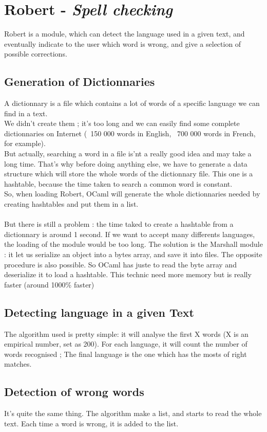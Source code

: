 \chapter{Robert - \emph{Spell checking}}

Robert is a module, which can detect the language used in a given text, and eventually indicate
to the user which word is wrong, and give a selection of possible corrections.

\section{Generation of Dictionnaries}
A dictionnary is a file which contains a lot of words of a specific language we can find in
a text.\\
We didn't create them ; it's too long and we can easily find some complete dictionnaries on
Internet (~150 000 words in English, ~700 000 words in French, for example).\\
But actually, searching a word in a file is'nt a really good idea and may take a long time.
That's why before doing anything else, we have to generate a data structure which will store
the whole words of the dictionnary file. This one is a hashtable, because the
time taken to search a common word is constant.\\
So, when loading Robert, OCaml will generate the whole dictionnaries needed by creating hashtables
and put them in a list.\\
\\
But there is still a problem : the time taked to create a hashtable from a dictionnary is around 1
second. If we want to accept many differents languages, the loading of the module would be too long.
The solution is the Marshall module : it let us serialize an object into a bytes array, and save it
into files. The opposite procedure is also possible.
So OCaml has juste to read the byte array and deserialize it to load a hashtable. This technic need
more memory but is really faster (around 1000\% faster)
\section{Detecting language in a given Text}
The algorithm used is pretty simple: it will analyse the first X words (X is an empirical number, set
as 200). 
For each language, it will count the number of words recognised ; The final language is the one which has the mosts of right matches.
\section{Detection of wrong words}
It's quite the same thing. The algorithm make a list, and starts to read the whole text. Each time a word is wrong, it is added to the list.
